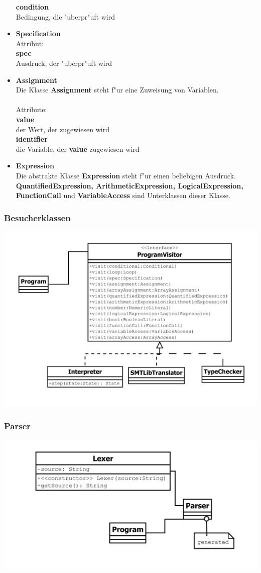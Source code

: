 \documentclass[10pt,a4paper,titlepage]{article}
\begin{document}
\begin{itemize}
\textbf{condition} \\
Bedingung, die "uberpr"uft wird
\item \textbf{Specification} \\
Attribut: \\
\textbf{spec} \\
Ausdruck, der "uberpr"uft wird
\item \textbf{Assignment} \\
Die Klasse \textbf{Assignment} steht f"ur eine Zuweisung von Variablen. \\\\
Attribute: \\
\textbf{value} \\
der Wert, der zugewiesen wird\\
\textbf{identifier} \\
die Variable, der \textbf{value} zugewiesen wird
\item \textbf{Expression} \\
Die abstrakte Klasse \textbf{Expression} steht f"ur einen beliebigen Ausdruck. \textbf{QuantifiedExpression, ArithmeticExpression, LogicalExpression, FunctionCall} und \textbf{VariableAccess} sind Unterklassen dieser Klasse.
\end{itemize}
\subsubsection{Besucherklassen}
\includegraphics[scale=0.7]{images/Besucher.pdf}
\subsubsection{Parser}
\includegraphics[scale=0.6]{images/Parser.pdf}
\end{document}
